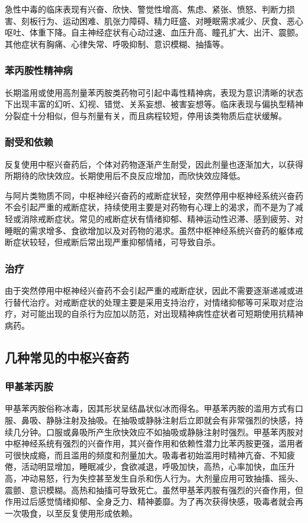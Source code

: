 急性中毒的临床表现有兴奋、欣快、警觉性增高、焦虑、紧张、愤怒、判断力损害、刻板行为、运动困难、肌张力障碍、精力旺盛、对睡眠需求减少、厌食、恶心呕吐、体重下降。自主神经症状有心动过速、血压升高、瞳孔扩大、出汗、震颤。其他症状有胸痛、心律失常、呼吸抑制、意识模糊、抽搐等。

\subsubsection{苯丙胺性精神病}

长期滥用或使用高剂量苯丙胺类药物可引起中毒性精神病，表现为意识清晰的状态下出现丰富的幻听、幻视、错觉、关系妄想、被害妄想等。临床表现与偏执型精神分裂症十分相似，但与剂量有关，而且病程较短，停用该类物质后症状缓解。

\subsubsection{耐受和依赖}

反复使用中枢兴奋药后，个体对药物逐渐产生耐受，因此剂量也逐渐加大，以获得所期待的欣快效应。长期使用后不良反应增加，而欣快效应降低。

与阿片类物质不同，中枢神经兴奋药的戒断症状轻，突然停用中枢神经系统兴奋药不会引起严重的戒断症状，持续使用主要是对药物有心理上的渴求，而不是为了减轻或消除戒断症状。常见的戒断症状有情绪抑郁、精神运动性迟滞、感到疲劳、对睡眠的需求增多、食欲增加以及对药物的渴求。虽然中枢神经系统兴奋药的躯体戒断症状较轻，但戒断后常出现严重抑郁情绪，可导致自杀。

\subsubsection{治疗}

由于突然停用中枢神经兴奋药不会引起严重的戒断症状，因此不需要逐渐递减或进行替代治疗。对戒断症状的处理主要是采用支持治疗，对情绪抑郁等可采取对症治疗，对可能出现的自杀行为应加以防范，对出现精神病性症状者可短期使用抗精神病药。

\subsection{几种常见的中枢兴奋药}

\subsubsection{甲基苯丙胺}

甲基苯丙胺俗称冰毒，因其形状呈结晶状似冰而得名。甲基苯丙胺的滥用方式有口服、鼻吸、静脉注射及抽吸。在抽吸或静脉注射后立即就会有非常强烈的快感，持续几分钟。口服或鼻吸所产生欣快效应不如抽吸或静脉注射时强烈。甲基苯丙胺对中枢神经系统有强烈的兴奋作用，其兴奋作用和依赖性潜力比苯丙胺更强，滥用者可很快成瘾，而且滥用的频度和剂量加大。吸毒者初始滥用时精神亢奋、不知疲倦，活动明显增加，睡眠减少，食欲减退，呼吸加快，高热，心率加快，血压升高，冲动易怒，行为失控甚至发生自杀和伤人行为。大剂量应用可致抽搐、摇头、震颤、意识模糊。高热和抽搐可导致死亡。虽然甲基苯丙胺有强烈的兴奋作用，但作用过后感觉情绪抑郁、全身乏力、精神萎靡。为了再次获得快感，吸毒者就会再一次吸食，以至反复使用形成依赖。

